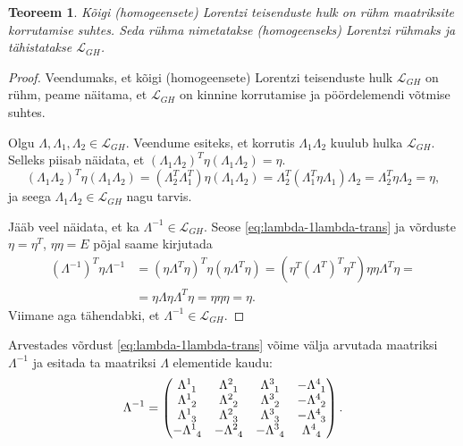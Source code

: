 \documentclass[12pt,a4paper,oneside]{article}
\theoremstyle{plain}
\newtheorem{teoreem}{Teoreem}[section]
\theoremstyle{definition}
\numberwithin{equation}{section}
\def\L{{\mathcal L}}
\begin{document}
\begin{teoreem}
Kõigi (homogeensete) Lorentzi teisenduste hulk on rühm maatriksite 
korrutamise suhtes. Seda rühma nimetatakse \emph{(homogeenseks) 
Lorentzi rühmaks} ja tähistatakse $\L_{GH}$.
\end{teoreem}

\begin{proof}
Veendumaks, et kõigi (homogeensete) Lorentzi teisenduste hulk 
$\L_{GH}$ on rühm, peame näitama, et $\L_{GH}$ on kinnine korrutamise 
ja pöörd\-elemendi võtmise suhtes.

Olgu $\Lambda, \Lambda_1, \Lambda_2 \in \L_{GH}$. Veendume esiteks, 
et korrutis $\Lambda_1 \Lambda_2$ kuulub hulka $\L_{GH}$. Selleks 
piisab näidata, et $\left(\Lambda_1 \Lambda_2\right)^T \eta 
\left(\Lambda_1 \Lambda_2\right) = \eta$.
\begin{equation*}
\left(\Lambda_1 \Lambda_2\right)^T \eta 
\left(\Lambda_1 \Lambda_2\right) = 
\left(\Lambda_2^T \Lambda_1^T\right) \eta 
\left(\Lambda_1 \Lambda_2\right) = \Lambda_2^T 
\left(\Lambda_1^T \eta \Lambda_1 \right) \Lambda_2 = 
\Lambda_2^T \eta \Lambda_2 = \eta,
\end{equation*}
ja seega $\Lambda_1 \Lambda_2 \in \L_{GH}$ nagu tarvis.

Jääb veel näidata, et ka $\Lambda^{-1 } \in \L_{GH}$. Seose 
\ref{eq:lambda-1lambda-trans} ja võrduste $\eta = \eta^T$, 
$\eta \eta = E$ põjal saame kirjutada
\begin{align*}
\left(\Lambda^{-1}\right)^T \eta \Lambda^{-1} &= 
\left(\eta \Lambda^T \eta \right)^T \eta 
\left(\eta \Lambda^T \eta\right) = 
\left(\eta^T \left(\Lambda^T\right)^T \eta^T \right) 
\eta \eta \Lambda^T \eta = \\
&= \eta \Lambda \eta \Lambda^T \eta = \eta \eta \eta = \eta.
\end{align*}
Viimane aga tähendabki, et $\Lambda^{-1} \in \L_{GH}$.
\end{proof}

Arvestades võrdust \ref{eq:lambda-1lambda-trans} võime välja 
arvutada maatriksi $\Lambda^{-1}$ ja esitada ta maatriksi $\Lambda$ 
elementide kaudu:
\[\Lambda^{-1} = \begin{pmatrix}
\Lambda\indices{^1_1} & \Lambda\indices{^2_1} & 
	\Lambda\indices{^3_1} & -\Lambda\indices{^4_1} \\ 
\Lambda\indices{^1_2} & \Lambda\indices{^2_2} & 
	\Lambda\indices{^3_2} & -\Lambda\indices{^4_2} \\  
\Lambda\indices{^1_3} & \Lambda\indices{^2_3} & 
	\Lambda\indices{^3_3} & -\Lambda\indices{^4_3} \\ 
-\Lambda\indices{^1_4} & -\Lambda\indices{^2_4} & 
	-\Lambda\indices{^3_4} & \Lambda\indices{^4_4} \\ 
\end{pmatrix}.\]
\end{document}
